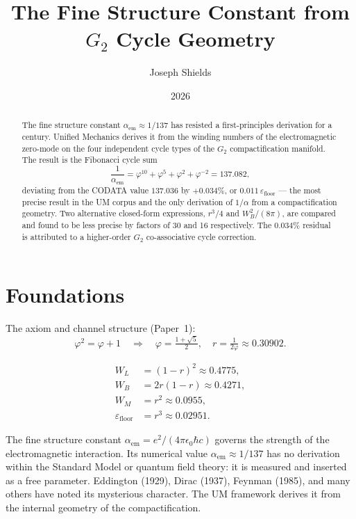 \documentclass[12pt]{article}
\title{\textbf{The Fine Structure Constant from $G_2$ Cycle Geometry}}
\author{Joseph Shields}
\date{2026}
\begin{document}
\maketitle

\begin{abstract}
The fine structure constant $\alpha_{\text{em}} \approx 1/137$ has
resisted a first-principles derivation for a century. Unified Mechanics
derives it from the winding numbers of the electromagnetic zero-mode
on the four independent cycle types of the $G_2$ compactification
manifold. The result is the Fibonacci cycle sum
\begin{equation*}
  \frac{1}{\alpha_{\text{em}}}
  = \varphi^{10} + \varphi^5 + \varphi^2 + \varphi^{-2}
  = 137.082,
\end{equation*}
deviating from the CODATA value $137.036$ by $+0.034\%$,
or $0.011\,\varepsilon_{\text{floor}}$ --- the most precise result in
the UM corpus and the only derivation of $1/\alpha$ from a
compactification geometry. Two alternative closed-form expressions,
$r^3/4$ and $W_B^2/(8\pi)$, are compared and found to be less
precise by factors of 30 and 16 respectively. The $0.034\%$ residual
is attributed to a higher-order $G_2$ co-associative cycle correction.
\end{abstract}

\section{Foundations}

The axiom and channel structure (Paper~1):
\begin{equation}
  \varphi^2 = \varphi + 1 \quad\Rightarrow\quad
  \varphi = \tfrac{1+\sqrt{5}}{2},\quad
  r = \tfrac{1}{2\varphi} \approx 0.30902.
  \label{eq:axiom}
\end{equation}

\begin{align}
  W_L &= (1-r)^2 \approx 0.4775, \label{eq:wl}\\
  W_B &= 2r(1-r) \approx 0.4271, \label{eq:wb}\\
  W_M &= r^2     \approx 0.0955, \label{eq:wm}\\
  \varepsilon_{\text{floor}} &= r^3 \approx 0.02951. \label{eq:eps}
\end{align}

The fine structure constant $\alpha_{\text{em}} = e^2/(4\pi\epsilon_0
\hbar c)$ governs the strength of the electromagnetic interaction.
Its numerical value $\alpha_{\text{em}} \approx 1/137$ has no
derivation within the Standard Model or quantum field theory: it is
measured and inserted as a free parameter. Eddington (1929), Dirac
(1937), Feynman (1985), and many others have noted its mysterious
character. The UM framework derives it from the internal geometry of
the compactification.
\end{document}
